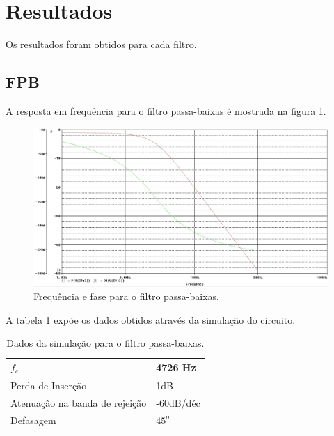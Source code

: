 \newpage
\section{Resultados}

Os resultados foram obtidos para cada filtro.

\subsection{FPB}

A resposta em frequência para o filtro passa-baixas é mostrada na figura \ref{fRFPB}.

\begin{figure}[H]
 \centering
 \label{fRFPB}
 \includegraphics[scale=0.5]{Imagens/rfpb.jpg}
 \caption{Frequência e fase para o filtro passa-baixas.}
 \end{figure}
  
A tabela \ref{tFPB} expõe os dados obtidos através da simulação do circuito.

\begin{small}
\begin{table}[H]
\begin{center}
\caption{Dados da simulação para o filtro passa-baixas.}

\begin{tabular}{l|l}
\hline
\hline
$f_c$ & 4726 Hz\\
\hline
Perda de Inserção & 1dB\\
\hline
Atenuação na banda de rejeição & -60dB/déc \\
\hline
Defasagem & $45^o$ \\
\hline
\hline
\end{tabular}

\label{tFPB}
\end{center}
\end{table}
\end{small}

